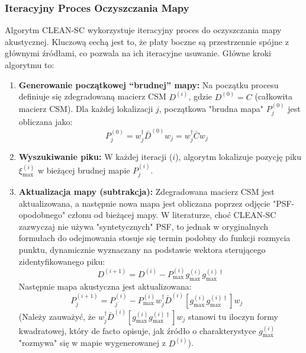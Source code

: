 \documentclass[12pt]{article}
\begin{document}
\subsubsection{Iteracyjny Proces Oczyszczania Mapy}
Algorytm CLEAN-SC wykorzystuje iteracyjny proces do oczyszczania mapy akustycznej. Kluczową cechą jest to, że płaty boczne są przestrzennie spójne z głównymi źródłami, co pozwala na ich iteracyjne usuwanie.
Główne kroki algorytmu to:
\begin{enumerate}
    \item \textbf{Generowanie początkowej ``brudnej'' mapy:} Na początku procesu definiuje się zdegradowaną macierz CSM $D^{(i)}$, gdzie $D^{(0)} = C$ (całkowita macierz CSM). Dla każdej lokalizacji $j$, początkowa "brudna mapa" $P^{(0)}_j$ jest obliczana jako:
    \begin{equation}
    P^{(0)}_j = w_j^\dagger \bar{D}^{(0)} w_j = w_j^\dagger \bar{C} w_j \quad \text{}
    \end{equation}

    \item \textbf{Wyszukiwanie piku:} W każdej iteracji ($i$), algorytm lokalizuje pozycję piku $\xi^{(i)}_{\text{max}}$ w bieżącej brudnej mapie $P^{(i)}_j$.

    \item \textbf{Aktualizacja mapy (subtrakcja):} Zdegradowana macierz CSM jest aktualizowana, a następnie nowa mapa jest obliczana poprzez odjęcie "PSF-opodobnego" członu od bieżącej mapy. W literaturze, choć CLEAN-SC zazwyczaj nie używa "syntetycznych" PSF, to jednak w oryginalnych formułach do odejmowania stosuje się termin podobny do funkcji rozmycia punktu, dynamicznie wyznaczany na podstawie wektora sterującego zidentyfikowanego piku:
    \begin{equation}
    D^{(i+1)} = D^{(i)} - P^{(i)}_{\text{max}} g^{(i)}_{\text{max}} g^{(i)\dagger}_{\text{max}} 
    \end{equation}
    Następnie mapa akustyczna jest aktualizowana:
    \begin{equation}
    P^{(i+1)}_j = P^{(i)}_j - P^{(i)}_{\text{max}} w_j^\dagger \bar{D}^{(i)}[g^{(i)}_{\text{max}} g^{(i)\dagger}_{\text{max}}] w_j \quad \text{}
    \end{equation}
    (Należy zauważyć, że $w_j^\dagger \bar{D}^{(i)}[g^{(i)}_{\text{max}} g^{(i)\dagger}_{\text{max}}] w_j$ stanowi tu iloczyn formy kwadratowej, który de facto opisuje, jak źródło o charakterystyce $g^{(i)}_{\text{max}}$ "rozmywa" się w mapie wygenerowanej z $D^{(i)}$).


\end{enumerate}
\end{document}
